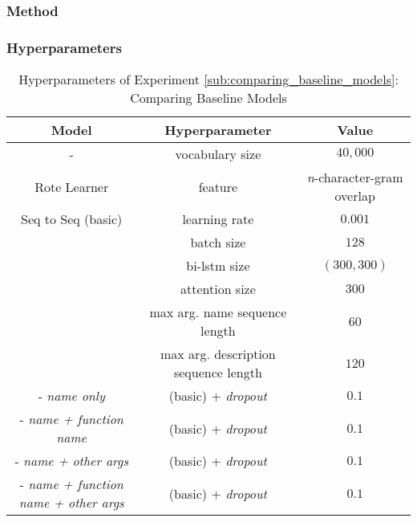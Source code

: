 \subsubsection{Method} %


\subsubsection{Hyperparameters}

\begin{table}[h!]
\begin{center}
\begin{tabular}{ c | c | c  }
    Model                             & Hyperparameter  & Value    \\
    \hline
    -                                 & vocabulary size            & $40,000$ \\
    \hline
    Rote Learner                      & feature                    & \textit{n}-character-gram overlap \\
    \hline
    Seq to Seq  (basic)               & learning rate              & $0.001$         \\
                                      & batch size                 & $128$           \\
                                      & bi-lstm size               & $(300,300) $    \\
                                      & attention size             & $300$           \\
                                      & max arg. name sequence length         & $60$   \\
                                      & max arg. description sequence length  & $120$  \\
    \hdashline
    - \textit{name only}              & (basic) + \textit{dropout}           & $0.1$           \\
    - \textit{name + function name}   & (basic) + \textit{dropout}           & $0.1$           \\
    - \textit{name + other args}      & (basic) + \textit{dropout}           & $0.1$           \\
    - \textit{name + function name + other args} & (basic) + \textit{dropout}   & $0.1$        \\
\end{tabular}
\caption {Hyperparameters of Experiment \ref{sub:comparing_baseline_models}: Comparing Baseline Models }
\label{table:hyperparams_name_baseline}
\end{center}
\end{table}


